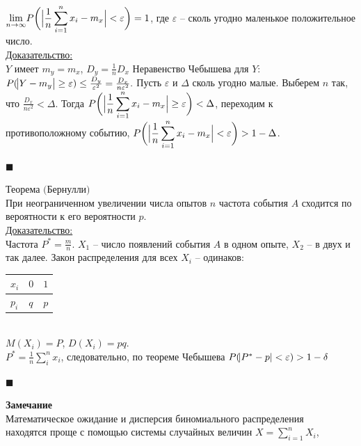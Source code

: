 \documentclass[russian, 12pt, fleqn,x11names]{article}
\begin{document}
$\displaystyle{  \lim_{n\to{\infty}}  }  \displaystyle{ P\bigg (\Bigl|\frac{1}{n} \sum\limits_{i = 1}^{n} x_i - m_x \Bigr| < \varepsilon\bigg ) = 1}$, где $ \varepsilon$ --  сколь угодно маленькое положительное число.\\
\underline{Доказательство:}\\
$Y$ имеет $m_y=m_x$, $D_y = \frac{1}{n}D_x$ Неравенство Чебышева для $Y$:\\ $P(\abs{Y-m_y} \geq \varepsilon) \leq \frac{D_y}{\varepsilon^2} = \frac{D_x}{n\varepsilon^2}.$
Пусть $\varepsilon$ и $\Delta$ сколь угодно малые. Выберем $n$ так, что $\frac{D_x}{n\varepsilon^2} < \Delta$. Тогда $\displaystyle{P\bigg ( \Bigl| \frac{1}{n}  \sum\limits_{i = 1}^{n} x_i - m_x\Bigr| \geq \varepsilon \bigg ) < \Delta}$, переходим к противоположному событию,  $\displaystyle{P\bigg (\Bigl| \frac{1}{n}  \sum\limits_{i = 1}^{n} x_i - m_x\Bigr|  < \varepsilon \bigg ) > 1 - \Delta}$.\\
\begin{flushright}\(\blacksquare\)\end{flushright}
$\textbf{Теорема (Бернулли)}$\\
При неограниченном увеличении числа опытов $n$ частота события $A$ сходится по вероятности к его вероятности $p$.\\
\underline{Доказательство:}\\
Частота $P^* = \frac{m}{n}$. $X_1$ -- число появлений события $A$ в одном опыте, $X_2$ --  в двух и так далее. Закон распределения для всех $X_i$ -- одинаков:\\
\begin{tabular}[b]{ | l | l |  l |  }
\hline
$ x_i$ & $0$ & $1$   \\
\hline
  $p_i$   & $q$  & $p$   \\
\hline
\end{tabular}\\
$M(X_i) = P$, $D(X_i) = pq$.\\
$P^* = \frac{1}{n} \displaystyle{\sum_{i}^{n}} x_i$,  следовательно, по теореме Чебышева $P(\abs{P^* - p} < \varepsilon) > 1 - \delta$\\
\begin{flushright}\(\blacksquare\)\end{flushright}
\textbf{Замечание\ } \\
Математическое ожидание и дисперсия биномиального распределения \\ находятся проще с помощью системы случайных величин $X = \displaystyle{\sum\limits_{i = 1}^{n}} X_i$, 
\end{document}
